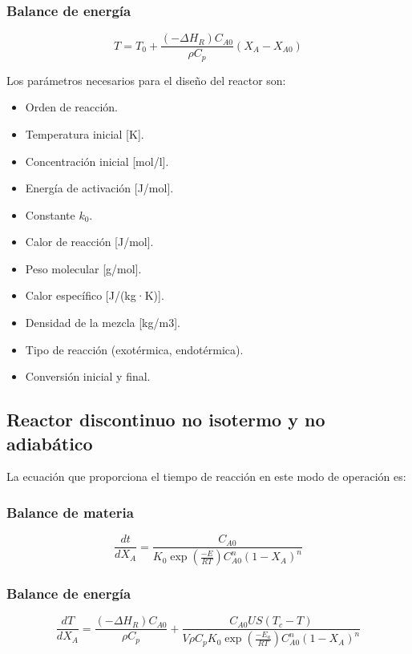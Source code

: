 \documentclass[20pt,a4paper]{extarticle}
\begin{document}
		\subsubsection{Balance de energía}
			\begin{equation*}
				T = T_0 + \frac{(-\Delta H_R)C_{A0}}{\rho C_p}(X_A-X_{A0})
			\end{equation*}
			
		Los parámetros necesarios para el diseño del reactor son:
		
		\begin{itemize}
			\item Orden de reacción.
			\item Temperatura inicial [K].
			\item Concentración inicial [mol/l].
			\item Energía de activación [J/mol].
			\item Constante $k_0$.
			\item Calor de reacción [J/mol].
			\item Peso molecular [g/mol].
			\item Calor específico [J/(kg·K)].
			\item Densidad de la mezcla [kg/m3].
			\item Tipo de reacción (exotérmica, endotérmica).
			\item Conversión inicial y final.
		\end{itemize}
			
	\subsection{Reactor discontinuo no isotermo y no adiabático}
		La ecuación que proporciona el tiempo de reacción en este modo de operación es:
		
		\subsubsection{Balance de materia}
			\begin{equation*}
				\frac{dt}{dX_A} = \frac{C_{A0}}{K_0 \exp\left(\frac{-E}{RT}\right) C_{A0}^n (1-X_A)^n}
			\end{equation*}
			
		\subsubsection{Balance de energía}
			\begin{equation*}
				\frac{dT}{dX_A} = \frac{(-\Delta H_R)C_{A0}}{\rho C_p} + \frac{C_{A0}US(T_c-T)}{V\rho C_p K_0 \exp\left(\frac{-E_a}{RT}\right)C_{A0}^n(1-X_A)^n}
			\end{equation*}
			
\end{document}
